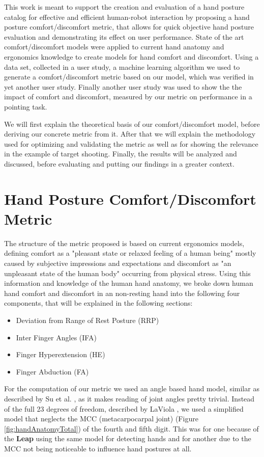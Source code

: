 \documentclass{sig-alternate-05-2015}
\begin{document}
This work is meant to support the creation and evaluation of a hand posture catalog for effective and efficient human-robot interaction by proposing a hand posture comfort/discomfort metric, that allows for quick objective hand posture evaluation and demonstrating its effect on user performance. State of the art comfort/discomfort models were applied to current hand anatomy and ergonomics knowledge to create models for hand comfort and discomfort. Using a data set, collected in a user study, a machine learning algorithm we used to generate a comfort/discomfort metric based on our model, which was verified in yet another user study. Finally another user study was used to show the the impact of comfort and discomfort, measured by our metric on performance in a pointing task.

We will first explain the theoretical basis of our comfort/discomfort model, before deriving our concrete metric from it. After that we will explain the methodology used for optimizing and validating the metric as well as for showing the relevance in the example of target shooting. Finally, the results will be analyzed and discussed, before evaluating and putting our findings in a greater context.


\section{Hand Posture Comfort/Discomfort Metric}
The structure of the metric proposed is based on current ergonomics models, defining comfort as a "pleasant state or relaxed feeling of a human being" mostly caused by subjective impressions and expectations and discomfort as "an unpleasant state of the human body" occurring from physical stress.\cite{vink2012editorial} Using this information and knowledge of the human hand anatomy, we broke down human hand comfort and discomfort in an non-resting hand into the following four components, that will be explained in the following sections: 

\begin{itemize}
	\item Deviation from Range of Rest Posture (RRP)
	\item Inter Finger Angles (IFA)
	\item Finger Hyperextension (HE)
	\item Finger Abduction (FA)
\end{itemize}

For the computation of our metric we used an angle based hand model, similar as described by Su et al. \cite{su1994logical}, as it makes reading of joint angles pretty trivial. Instead of the full 23 degrees of freedom, described by LaViola \cite{laviola1999survey}, we used a simplified model that neglects the MCC (metacarpocarpal joint) (Figure \ref{fig:handAnatomyTotal}) of the fourth and fifth digit. This was for one because of the \textbf{Leap} using the same model for detecting hands and for another due to the MCC not being noticeable to influence hand postures at all.
\end{document}
